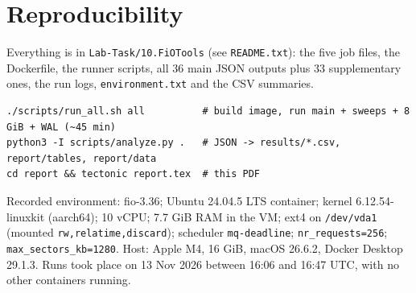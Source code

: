 \documentclass[11pt,a4paper]{article}
\begin{document}
\section{Reproducibility}

Everything is in \texttt{Lab-Task/10.FiOTools} (see \texttt{README.txt}): the five job files, the Dockerfile,
the runner scripts, all 36 main JSON outputs plus 33 supplementary ones, the run logs, \texttt{environment.txt}
and the CSV summaries.

\begin{lstlisting}[columns=fixed]
./scripts/run_all.sh all          # build image, run main + sweeps + 8 GiB + WAL (~45 min)
python3 -I scripts/analyze.py .   # JSON -> results/*.csv, report/tables, report/data
cd report && tectonic report.tex  # this PDF
\end{lstlisting}

Recorded environment: fio-3.36; Ubuntu 24.04.5 LTS container; kernel 6.12.54-linuxkit (aarch64); 10 vCPU;
7.7 GiB RAM in the VM; ext4 on \texttt{/dev/vda1} (mounted \texttt{rw,relatime,discard}); scheduler \texttt{mq-deadline};
\texttt{nr\_requests=256}; \texttt{max\_sectors\_kb=1280}. Host: Apple M4, 16 GiB, macOS 26.6.2, Docker Desktop 29.1.3.
Runs took place on 13 Nov 2026 between 16:06 and 16:47 UTC, with no other containers running.
\end{document}

